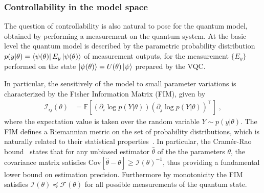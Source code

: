 \documentclass[aps,10pt,groupedaddress,prx,superscriptaddress,twocolumn,balancelastpage, tightenlines]{revtex4-2}
\theoremstyle{plain}  %
\begin{document}


\subsubsection{Controllability in the model space}

The question of controllability is also natural to pose for the quantum model, obtained by performing a measurement on the quantum system. At the basic level the quantum model is described by the parametric probability distribution $p(y|\theta) = \bra{\psi(\theta)} E_y \ket{\psi(\theta)}$ of measurement outputs, for the measurement $\{E_y\}$ performed on the state  $\ket{\psi(\theta)}=U(\theta)\ket{\psi}$ prepared by the VQC.


In particular, the sensitively of the model to small parameter variations is characterized by the Fisher Information Matrix (FIM), given by 
\begin{equation}
\begin{split}
    \mathcal{I}_{ij}(\theta) & = \mathbb{E} \left[ (\partial_i  \log p(Y|\theta)) (\partial_j  \log p(Y|\theta))^\top \right] \; ,
\end{split}
\end{equation}
where the expectation value is taken over the random variable $Y\sim p(y|\theta)$. The FIM defines a Riemannian metric on the set of probability distributions, which is naturally related to their statistical properties~\cite{kay1993statistical}. In particular, the Cram\'er-Rao bound~\cite{kay1993statistical} states that for any unbiased estimator $\hat{\theta}$ of the the parameters $\theta$, the covariance matrix satisfies $\text{Cov}[\hat{\theta}-\theta] \geq \mathcal{I}(\theta)^{-1}$, thus providing a fundamental lower bound on estimation precision. Furthermore by monotonicity the FIM satisfies $ \mathcal{I}(\theta)\preceq  \mathcal{F}(\theta)$ for all possible measurements of the quantum state.
\end{document}
